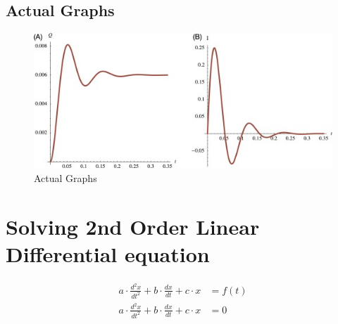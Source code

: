 \documentclass{article}
\begin{document}
\subsection*{Actual Graphs}

\begin{figure}[H]
    \centering
    \includegraphics[width = 13cm]{Expected.jpg}      
    \caption{Actual Graphs}
    \label{fig:Actual Graphs}
\end{figure}

\section*{Solving 2nd Order Linear Differential equation}
\begin{align}
    a\cdot\frac{d^2x}{dt^2}+b\cdot\frac{dx}{dt}+c\cdot x &= f(t) \label{eq:2d}\\
    a\cdot\frac{d^2x}{dt^2}+b\cdot\frac{dx}{dt}+c\cdot x &= 0 \label{eq:2dhomo}
\end{align}
\end{document}
